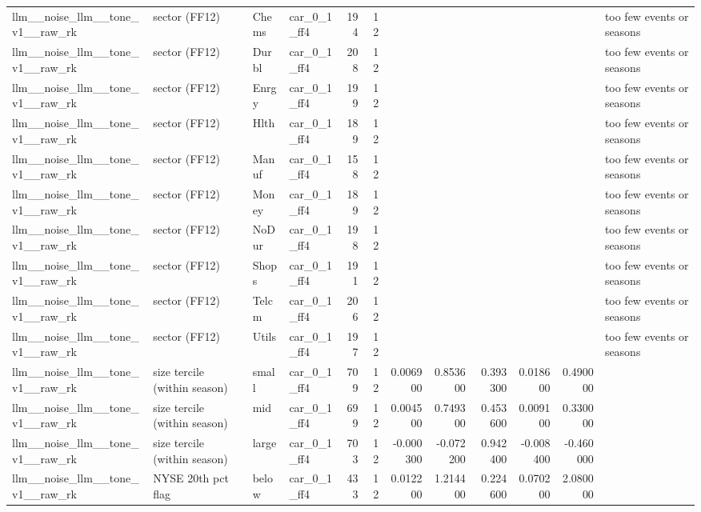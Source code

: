 \begin{table}
\begin{tabular}{llllrrrrrrrl}
llm\_\_noise\_llm\_\_tone\_v1\_\_raw\_rk & sector (FF12) & Chems & car\_0\_1\_ff4 & 194 & 12 &  &  &  &  &  & too few events or seasons \\
llm\_\_noise\_llm\_\_tone\_v1\_\_raw\_rk & sector (FF12) & Durbl & car\_0\_1\_ff4 & 208 & 12 &  &  &  &  &  & too few events or seasons \\
llm\_\_noise\_llm\_\_tone\_v1\_\_raw\_rk & sector (FF12) & Enrgy & car\_0\_1\_ff4 & 199 & 12 &  &  &  &  &  & too few events or seasons \\
llm\_\_noise\_llm\_\_tone\_v1\_\_raw\_rk & sector (FF12) & Hlth & car\_0\_1\_ff4 & 189 & 12 &  &  &  &  &  & too few events or seasons \\
llm\_\_noise\_llm\_\_tone\_v1\_\_raw\_rk & sector (FF12) & Manuf & car\_0\_1\_ff4 & 158 & 12 &  &  &  &  &  & too few events or seasons \\
llm\_\_noise\_llm\_\_tone\_v1\_\_raw\_rk & sector (FF12) & Money & car\_0\_1\_ff4 & 189 & 12 &  &  &  &  &  & too few events or seasons \\
llm\_\_noise\_llm\_\_tone\_v1\_\_raw\_rk & sector (FF12) & NoDur & car\_0\_1\_ff4 & 198 & 12 &  &  &  &  &  & too few events or seasons \\
llm\_\_noise\_llm\_\_tone\_v1\_\_raw\_rk & sector (FF12) & Shops & car\_0\_1\_ff4 & 191 & 12 &  &  &  &  &  & too few events or seasons \\
llm\_\_noise\_llm\_\_tone\_v1\_\_raw\_rk & sector (FF12) & Telcm & car\_0\_1\_ff4 & 206 & 12 &  &  &  &  &  & too few events or seasons \\
llm\_\_noise\_llm\_\_tone\_v1\_\_raw\_rk & sector (FF12) & Utils & car\_0\_1\_ff4 & 197 & 12 &  &  &  &  &  & too few events or seasons \\
llm\_\_noise\_llm\_\_tone\_v1\_\_raw\_rk & size tercile (within season) & small & car\_0\_1\_ff4 & 709 & 12 & 0.006900 & 0.853600 & 0.393300 & 0.018600 & 0.490000 &  \\
llm\_\_noise\_llm\_\_tone\_v1\_\_raw\_rk & size tercile (within season) & mid & car\_0\_1\_ff4 & 699 & 12 & 0.004500 & 0.749300 & 0.453600 & 0.009100 & 0.330000 &  \\
llm\_\_noise\_llm\_\_tone\_v1\_\_raw\_rk & size tercile (within season) & large & car\_0\_1\_ff4 & 703 & 12 & -0.000300 & -0.072200 & 0.942400 & -0.008400 & -0.460000 &  \\
llm\_\_noise\_llm\_\_tone\_v1\_\_raw\_rk & NYSE 20th pct flag & below & car\_0\_1\_ff4 & 433 & 12 & 0.012200 & 1.214400 & 0.224600 & 0.070200 & 2.080000 &  \\

\end{tabular}
\end{table}
